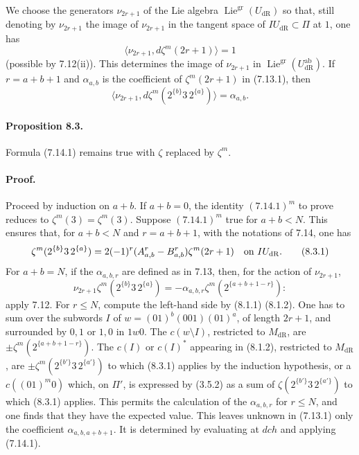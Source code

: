\documentclass[10pt]{article}
\newcommand{\Lie}{\operatorname{Lie}}
\newcommand{\dR}{\mathrm{dR}}
\begin{document}
We choose the generators $\nu_{2r+1}$ of the Lie algebra $\Lie^{\mathrm{gr}}(U_{\dR})$ so that, still denoting by $\nu_{2r+1}$ the image of $\nu_{2r+1}$ in the tangent space of $IU_{\dR}\subset\Pi$ at $1$, one has
\[
\langle\nu_{2r+1},d\zeta^m(2r+1)\rangle=1
\]
(possible by 7.12(ii)). This determines the image of $\nu_{2r+1}$ in $\Lie^{\mathrm{gr}}(U_{\dR}^{\mathrm{ab}})$. If $r=a+b+1$ and $\alpha_{a,b}$ is the coefficient of $\zeta^m(2r+1)$ in (7.13.1), then
\[
\langle\nu_{2r+1},d\zeta^m(2^{\{b\}}3\,2^{\{a\}})\rangle=\alpha_{a,b}.
\]

\paragraph{Proposition 8.3.}
Formula (7.14.1) remains true with $\zeta$ replaced by $\zeta^m$.

\paragraph{Proof.}
Proceed by induction on $a+b$. If $a+b=0$, the identity $(7.14.1)^m$ to prove reduces to $\zeta^m(3)=\zeta^m(3)$. Suppose $(7.14.1)^m$ true for $a+b<N$. This ensures that, for $a+b<N$ and $r=a+b+1$, with the notations of 7.14, one has
\begin{equation}
\zeta^m(2^{\{b\}}3\,2^{\{a\}})=2(-1)^r(A^r_{a,b}-B^r_{a,b})\zeta^m(2r+1)\quad\hbox{on }IU_{\dR}.
\tag{8.3.1}
\end{equation}
For $a+b=N$, if the $\alpha_{a,b,r}$ are defined as in 7.13, then, for the action of $\nu_{2r+1}$,
\begin{equation}
\nu_{2r+1}\zeta^m(2^{\{b\}}3\,2^{\{a\}})=-\alpha_{a,b,r}\zeta^m(2^{\{a+b+1-r\}}):
\tag{8.3.2}
\end{equation}
apply 7.12. For $r\leq N$, compute the left-hand side by (8.1.1) (8.1.2). One has to sum over the subwords $I$ of $w=(01)^b(001)(01)^a$, of length $2r+1$, and surrounded by $0,1$ or $1,0$ in $1w0$. The $c(w\setminus I)$, restricted to $M_{\dR}$, are $\pm\zeta^m(2^{\{a+b+1-r\}})$. The $c(I)$ or $c(I)^*$ appearing in (8.1.2), restricted to $M_{\dR}$, are $\pm\zeta^m(2^{\{b'\}}3\,2^{\{a'\}})$ to which (8.3.1) applies by the induction hypothesis, or a $c((01)^m0)$ which, on $\Pi'$, is expressed by (3.5.2) as a sum of $\zeta(2^{\{b'\}}3\,2^{\{a'\}})$ to which (8.3.1) applies. This permits the calculation of the $\alpha_{a,b,r}$ for $r\leq N$, and one finds that they have the expected value. This leaves unknown in (7.13.1) only the coefficient $\alpha_{a,b,a+b+1}$. It is determined by evaluating at $dch$ and applying (7.14.1).
\end{document}
